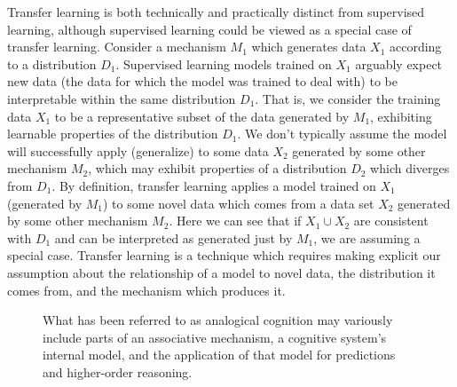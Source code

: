 \documentclass[11pt, oneside]{article}   	%
\begin{document}
Transfer learning is both technically and practically distinct from supervised learning, although supervised learning could be viewed as a special case of transfer learning.  Consider a mechanism $M_1$ which generates data $X_1$ according to a distribution $D_1$.  Supervised learning models trained on $X_1$ arguably expect new data (the data for which the model was trained to deal with) to be interpretable within the same distribution $D_1$.  That is, we consider the training data $X_1$ to be a representative subset of the data generated by $M_1$, exhibiting learnable properties of the distribution $D_1$.  We don't typically assume the model will successfully apply (generalize) to some data $X_2$ generated by some other mechanism $M_2$, which may exhibit properties of a distribution $D_2$ which diverges from $D_1$.  By definition, transfer learning applies a model trained on $X_1$ (generated by $M_1$) to some novel data which comes from a data set $X_2$ generated by some other mechanism $M_2$.  Here we can see that if $X_1 \cup X_2$ are consistent with $D_1$ and can be interpreted as  generated just by $M_1$, we are assuming a special case.  Transfer learning is a technique which requires making explicit our assumption about the relationship of a model to novel data, the distribution it comes from, and the mechanism which produces it.




\begin{figure}
\begin{center}
\caption{What has been referred to as analogical cognition may variously include parts of an associative mechanism, a cognitive system's internal model, and the application of that model for predictions and higher-order reasoning.  }

\end{center}
\end{figure}
\end{document}
